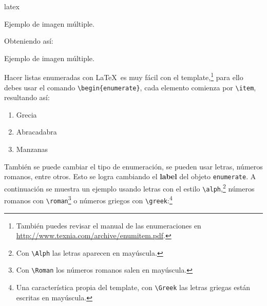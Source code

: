 \begin{sourcecode}{latex}{}
\begin{images}[\label{imagenmultiple}]{Ejemplo de imagen múltiple.}
	\imagesnewline
\end{images}
\end{sourcecode}

	Obteniendo así:

	\begin{images}{Ejemplo de imagen múltiple.}
		\imagesnewline
	\end{images}


\newpage



		Hacer listas enumeradas con \LaTeX\ es muy fácil con el template,\footnote{También puedes revisar el manual de las enumeraciones en \url{http://www.texnia.com/archive/enumitem.pdf}.} para ello debes usar el comando \texttt{\textbackslash begin\{enumerate\}}, cada elemento comienza por \texttt{\textbackslash item}, resultando así:

		\begin{enumerate}
			\item Grecia
			\item Abracadabra
			\item Manzanas
		\end{enumerate}

		También se puede cambiar el tipo de enumeración, se pueden usar letras, números romanos, entre otros. Esto se logra cambiando el \textbf{label} del objeto \texttt{enumerate}. A continuación se muestra un ejemplo usando letras con el estilo \texttt{\textbackslash alph},\footnote{Con \texttt{\textbackslash Alph} las letras aparecen en mayúscula.} números romanos con \texttt{\textbackslash roman}\footnote{Con \texttt{\textbackslash Roman} los números romanos salen en mayúscula.} o números griegos con \texttt{\textbackslash greek}:\footnote{Una característica propia del template, con \texttt{\textbackslash Greek} las letras griegas están escritas en mayúscula.}

